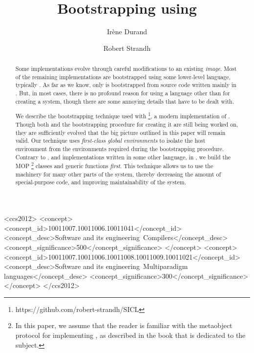 \documentclass[format=sigconf]{acmart}
\begin{document}
\title{Bootstrapping \commonlisp{} using \commonlisp{}}

\author{Irène Durand
}

\author{Robert Strandh}


\begin{abstract}
Some \commonlisp{} implementations evolve through careful
modifications to an existing \emph{image}.  Most of the remaining
implementations are bootstrapped using some lower-level language,
typically \clanguage{}.  As far as we know, only \sbcl{} is
bootstrapped from source code written mainly in \commonlisp{}.  But,
in most cases, there is no profound reason for using a language other
than \commonlisp{} for creating a \commonlisp{} system, though there
are some annoying details that have to be dealt with.

We describe the bootstrapping technique used with \sicl{}%
\footnote{https://github.com/robert-strandh/SICL}, a modern
implementation of \commonlisp{}.  Though both \sicl{} and the
bootstrapping procedure for creating it are still being worked on, they
are sufficiently evolved that the big picture outlined in this paper
will remain valid.  Our technique uses \emph{first-class global
  environments} to isolate the host environment from the environments
required during the bootstrapping procedure.  Contrary to \sbcl{}, and
implementations written in some other language, in \sicl{}, we build
the \clos{} MOP%
\footnote{In this paper, we assume that the reader is familiar with the
  metaobject protocol for implementing \clos{}, as described in the
  book \cite{Kiczales:1991:AMP:574212} that is dedicated to the subject.}
classes and generic functions \emph{first}.  This
technique allows us to use the \clos{} machinery for many other parts
of the system, thereby decreasing the amount of special-purpose code,
and improving maintainability of the system.
\end{abstract}

\begin{CCSXML}
<ccs2012>
<concept>
<concept_id>10011007.10011006.10011041</concept_id>
<concept_desc>Software and its engineering~Compilers</concept_desc>
<concept_significance>500</concept_significance>
</concept>
<concept>
<concept_id>10011007.10011006.10011008.10011009.10011021</concept_id>
<concept_desc>Software and its engineering~Multiparadigm languages</concept_desc>
<concept_significance>300</concept_significance>
</concept>
</ccs2012>
\end{CCSXML}
\end{document}
